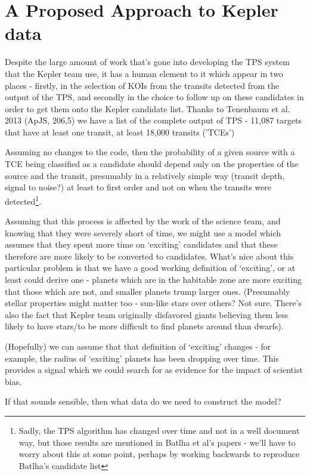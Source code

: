 \documentclass[12pt]{article}
\begin{document}
\section{A Proposed Approach to Kepler data}
Despite the large amount of work that's gone into developing the TPS system that the Kepler team use, it has a human element to it which appear in two places - firstly, in the selection of KOIs from the transits detected from the output of the TPS, and secondly in the choice to follow up on these candidates in order to get them onto the Kepler candidate list. Thanks to Tenenbaum et al. 2013 (ApJS, 206,5) we have a list of the complete output of TPS - 11,087 targets that have at least one transit, at least 18,000 transits ('TCEs')

Assuming no changes to the code, then the probability of a given source with a TCE being classified as a candidate should depend only on the properties of the source and the transit, presumably in a relatively simple way (transit depth, signal to noise?) at least to first order and not on when the transits were detected\footnote{Sadly, the TPS algorithm has changed over time and not in a well document way, but those results are mentioned in Batlha et al's papers - we'll have to worry about this at some point, perhaps by working backwards to reproduce Batlha's candidate list}. 

Assuming that this process is affected by the work of the science team, and knowing that they were severely short of time, we might use a model which assumes that they spent more time on `exciting' candidates and that these therefore are more likely to be converted to candidates. What's nice about this particular problem is that we have a good working definition of `exciting', or at least could derive one - planets which are in the habitable zone are more exciting that those which are not, and smaller planets trump larger ones. (Presumably stellar properties might matter too - sun-like stars over others? Not sure. There's also the fact that Kepler team originally disfavored giants believing them less likely to have stars/to be more difficult to find planets around than dwarfs). 

(Hopefully) we can assume that that definition of `exciting' changes - for example, the radius of `exciting' planets has been dropping over time. This provides a signal which we could search for as evidence for the impact of scientist bias.

If that sounds sensible, then what data do we need to construct the model?
 
\end{document}
